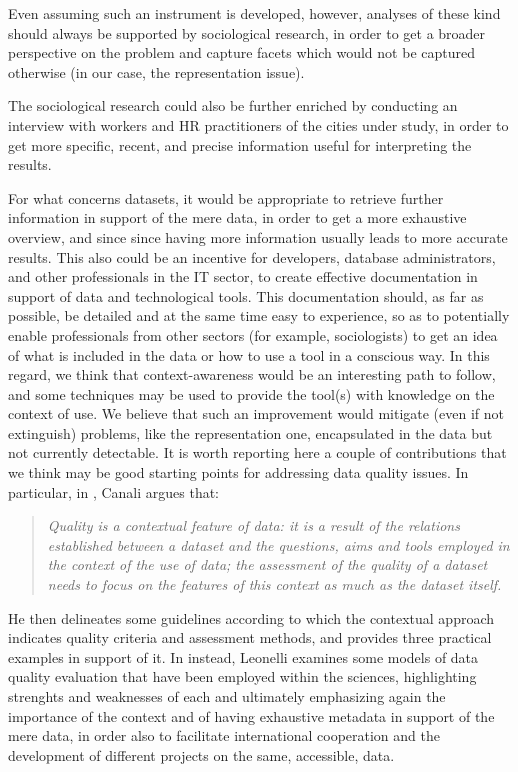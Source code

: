 Even assuming such an instrument is developed, however, analyses of these kind should always be supported by sociological research, in order to get a broader perspective on the problem and capture facets which would not be captured otherwise (in our case, the representation issue).

The sociological research could also be further enriched by conducting an interview with workers and HR practitioners of the cities under study, in order to get more specific, recent, and precise information useful for interpreting the results.

For what concerns datasets, it would be appropriate to retrieve further information in support of the mere data, in order to get a more exhaustive overview, and since since having more information usually leads to more accurate results. This also could be an incentive for developers, database administrators, and other professionals in the IT sector, to create effective documentation in support of data and technological tools. This documentation should, as far as possible, be detailed and at the same time easy to experience, so as to potentially enable professionals from other sectors (for example, sociologists) to get an idea of what is included in the data or how to use a tool in a conscious way. In this regard, we think that context-awareness would be an interesting path to follow, and some techniques may be used to provide the tool(s) with knowledge on the context of use. We believe that such an improvement would mitigate (even if not extinguish) problems, like the representation one, encapsulated in the data but not currently detectable. It is worth reporting here a couple of contributions that we think may be good starting points for addressing data quality issues. In particular, in \cite{canali2020towards}, Canali argues that:
\begin{quote}\emph{Quality is a contextual feature of data: it is a result of the relations established between a dataset and the questions, aims and tools employed in the context of the use of data; the assessment of the quality of a dataset needs to focus on the features of this context as much as the dataset itself.} \cite[p.~4]{canali2020towards}\end{quote}
He then delineates some guidelines according to which the contextual approach indicates quality criteria and assessment methods, and provides three practical examples in support of it. In \cite{leonelli2017global} instead, Leonelli examines some models of data quality evaluation that have been employed within the sciences, highlighting strenghts and weaknesses of each and ultimately emphasizing again the importance of the context and of having exhaustive metadata in support of the mere data, in order also to facilitate international cooperation and the development of different projects on the same, accessible, data.
